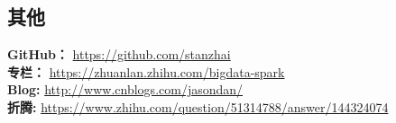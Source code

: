 \documentclass[UTF8,margin,line]{res}
\begin{document}
\begin{resume}
\section{\sc 其他}
\textbf{GitHub：} \url{https://github.com/stanzhai} \\
\textbf{专栏：} \url{https://zhuanlan.zhihu.com/bigdata-spark} \\
\textbf{Blog: } \url{http://www.cnblogs.com/jasondan/} \\
\textbf{折腾: } \url{https://www.zhihu.com/question/51314788/answer/144324074} \\

\end{resume}
\end{document}
